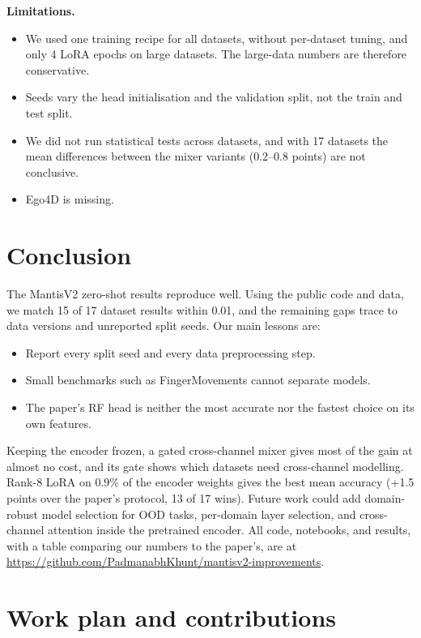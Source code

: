 \documentclass[conference]{IEEEtran}
\newcommand{\repo}{\url{https://github.com/PadmanabhKhunt/mantisv2-improvements}}
\begin{document}
\textbf{Limitations.}
\begin{itemize}
\item We used one training recipe for all datasets, without per-dataset tuning, and only 4 LoRA epochs on large
datasets. The large-data numbers are therefore conservative.
\item Seeds vary the head initialisation and the validation split, not the train and test split.
\item We did not run statistical tests across datasets, and with 17 datasets the mean differences between the mixer
variants (0.2--0.8 points) are not conclusive.
\item Ego4D is missing.
\end{itemize}

\section{Conclusion}

The MantisV2 zero-shot results reproduce well. Using the public code and data, we match 15 of 17 dataset results
within 0.01, and the remaining gaps trace to data versions and unreported split seeds. Our main lessons are:
\begin{itemize}
\item Report every split seed and every data preprocessing step.
\item Small benchmarks such as FingerMovements cannot separate models.
\item The paper's RF head is neither the most accurate nor the fastest choice on its own features.
\end{itemize}
Keeping the encoder frozen, a gated cross-channel mixer gives most of the gain at almost no cost, and its gate shows
which datasets need cross-channel modelling. Rank-8 LoRA on 0.9\% of the encoder weights gives the best mean
accuracy (+1.5 points over the paper's protocol, 13 of 17 wins). Future work could add domain-robust model selection
for OOD tasks, per-domain layer selection, and cross-channel attention inside the pretrained encoder. All code,
notebooks, and results, with a table comparing our numbers to the paper's, are at \repo.

\clearpage
\section*{Work plan and contributions}
\end{document}
